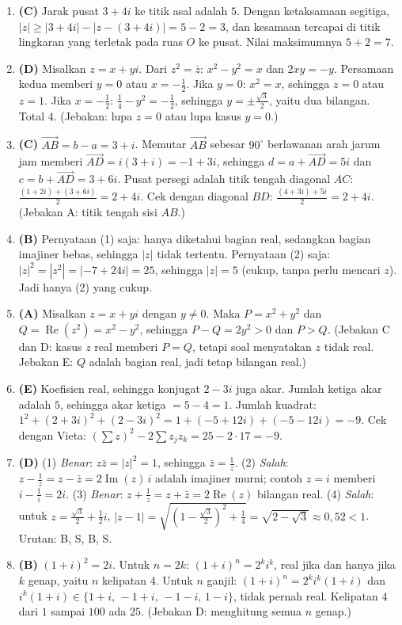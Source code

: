 \documentclass[a4paper,11pt]{article}
\renewcommand{\Re}{\operatorname{Re}}
\renewcommand{\Im}{\operatorname{Im}}
\begin{document}
\begin{enumerate}[leftmargin=2em,itemsep=2pt,topsep=2pt]
\item[\textbf{10.}] \textbf{(C)} Jarak pusat $3+4i$ ke titik asal adalah $5$. Dengan ketaksamaan segitiga, $|z|\ge|3+4i|-|z-(3+4i)|=5-2=3$, dan kesamaan tercapai di titik lingkaran yang terletak pada ruas $O$ ke pusat. Nilai maksimumnya $5+2=7$.
\item[\textbf{11.}] \textbf{(D)} Misalkan $z=x+yi$. Dari $z^2=\bar z$: $x^2-y^2=x$ dan $2xy=-y$. Persamaan kedua memberi $y=0$ atau $x=-\frac12$. Jika $y=0$: $x^2=x$, sehingga $z=0$ atau $z=1$. Jika $x=-\frac12$: $\frac14-y^2=-\frac12$, sehingga $y=\pm\frac{\sqrt3}{2}$, yaitu dua bilangan. Total $4$. (Jebakan: lupa $z=0$ atau lupa kasus $y=0$.)
\item[\textbf{12.}] \textbf{(C)} $\overrightarrow{AB}=b-a=3+i$. Memutar $\overrightarrow{AB}$ sebesar $90^\circ$ berlawanan arah jarum jam memberi $\overrightarrow{AD}=i(3+i)=-1+3i$, sehingga $d=a+\overrightarrow{AD}=5i$ dan $c=b+\overrightarrow{AD}=3+6i$. Pusat persegi adalah titik tengah diagonal $AC$: $\frac{(1+2i)+(3+6i)}{2}=2+4i$. Cek dengan diagonal $BD$: $\frac{(4+3i)+5i}{2}=2+4i$. (Jebakan A: titik tengah sisi $AB$.)
\item[\textbf{13.}] \textbf{(B)} Pernyataan (1) saja: hanya diketahui bagian real, sedangkan bagian imajiner bebas, sehingga $|z|$ tidak tertentu. Pernyataan (2) saja: $|z|^2=|z^2|=|-7+24i|=25$, sehingga $|z|=5$ (cukup, tanpa perlu mencari $z$). Jadi hanya (2) yang cukup.
\item[\textbf{14.}] \textbf{(A)} Misalkan $z=x+yi$ dengan $y\neq0$. Maka $P=x^2+y^2$ dan $Q=\Re(z^2)=x^2-y^2$, sehingga $P-Q=2y^2>0$ dan $P>Q$. (Jebakan C dan D: kasus $z$ real memberi $P=Q$, tetapi soal menyatakan $z$ tidak real. Jebakan E: $Q$ adalah bagian real, jadi tetap bilangan real.)
\item[\textbf{15.}] \textbf{(E)} Koefisien real, sehingga konjugat $2-3i$ juga akar. Jumlah ketiga akar adalah $5$, sehingga akar ketiga $=5-4=1$. Jumlah kuadrat: $1^2+(2+3i)^2+(2-3i)^2=1+(-5+12i)+(-5-12i)=-9$. Cek dengan Vieta: $(\sum z)^2-2\sum z_jz_k=25-2\cdot17=-9$.
\item[\textbf{16.}] \textbf{(D)} (1) \emph{Benar}: $z\bar z=|z|^2=1$, sehingga $\bar z=\frac1z$. (2) \emph{Salah}: $z-\frac1z=z-\bar z=2\Im(z)\,i$ adalah imajiner murni; contoh $z=i$ memberi $i-\frac1i=2i$. (3) \emph{Benar}: $z+\frac1z=z+\bar z=2\Re(z)$ bilangan real. (4) \emph{Salah}: untuk $z=\frac{\sqrt3}{2}+\frac12i$, $|z-1|=\sqrt{\left(1-\frac{\sqrt3}2\right)^2+\frac14}=\sqrt{2-\sqrt3}\approx0{,}52<1$. Urutan: B, S, B, S.
\item[\textbf{17.}] \textbf{(B)} $(1+i)^2=2i$. Untuk $n=2k$: $(1+i)^n=2^ki^k$, real jika dan hanya jika $k$ genap, yaitu $n$ kelipatan $4$. Untuk $n$ ganjil: $(1+i)^n=2^ki^k(1+i)$ dan $i^k(1+i)\in\{1+i,\,-1+i,\,-1-i,\,1-i\}$, tidak pernah real. Kelipatan $4$ dari $1$ sampai $100$ ada $25$. (Jebakan D: menghitung semua $n$ genap.)

\end{enumerate}
\end{document}
